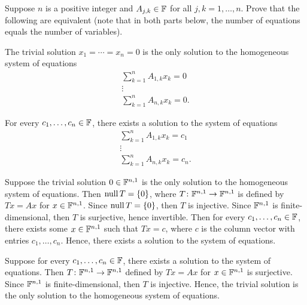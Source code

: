 \begin{exc}
\begin{exercise}
Suppose $n$ is a positive integer and $A_{j,k}\in\mathbb{F}$ for all
$j,k=1,\dots,n$. Prove that the following are equivalent (note that in both
parts below, the number of equations equals the number of variables).
\begin{parts}
\item The trivial solution $x_1=\cdots=x_n=0$ is the only solution to the
  homogeneous system of equations
  \[ \begin{gathered}
     \sum_{k=1}^n A_{1,k}x_k = 0\\ \vdots\\ \sum_{k=1}^n A_{n,k}x_k = 0.
     \end{gathered} \]
\item For every $c_1,\dots,c_n\in\mathbb{F}$, there exists a solution to the system of
  equations
  \[ \begin{gathered}
     \sum_{k=1}^n A_{1,k}x_k = c_1\\ \vdots\\ \sum_{k=1}^n A_{n,k}x_k = c_n.
     \end{gathered} \]
\end{parts}
\end{exercise}
\begin{solution}\leavevmode
\begin{parts}
\item Suppose the trivial solution $0\in\mathbb{F}^{n,1}$ is the only solution to the
  homogeneous system of equations. Then $\operatorname{null} T=\{0\}$, where
  $T\colon\mathbb{F}^{n,1}\to\mathbb{F}^{n,1}$ is defined by $Tx=Ax$ for $x\in\mathbb{F}^{n,1}$. Since
  $\operatorname{null} T=\{0\}$, then $T$ is injective. Since $\mathbb{F}^{n,1}$ is finite-dimensional,
  then $T$ is surjective, hence invertible. Then for every
  $c_1,\dots,c_n\in\mathbb{F}$, there exists some $x\in\mathbb{F}^{n,1}$ such that $Tx=c$,
  where $c$ is the column vector with entries $c_1,\dots,c_n$. Hence, there
  exists a solution to the system of equations.
\item Suppose for every $c_1,\dots,c_n\in\mathbb{F}$, there exists a solution to the
  system of equations. Then $T\colon\mathbb{F}^{n,1}\to\mathbb{F}^{n,1}$ defined by $Tx=Ax$ for
  $x\in\mathbb{F}^{n,1}$ is surjective. Since $\mathbb{F}^{n,1}$ is finite-dimensional, then
  $T$ is injective. Hence, the trivial solution is the only solution to the
  homogeneous system of equations.
\end{parts}
\end{solution}


\end{exc}
